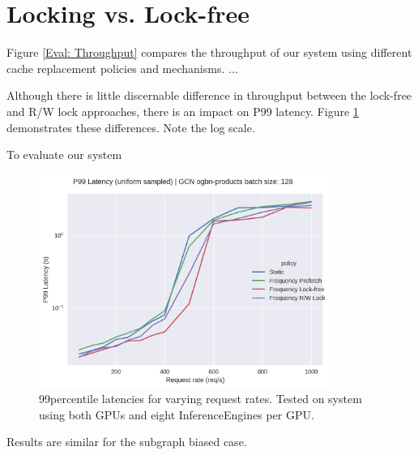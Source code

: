 \section{Locking vs. Lock-free}

Figure \ref{Eval: Throughput} compares the throughput of our system using different cache replacement policies and mechanisms.
...

Although there is little discernable difference in throughput between the lock-free and R/W lock approaches, there is an impact on P99 latency. Figure \ref{Eval: P99 latency} demonstrates these differences.
Note the log scale.

    

To evaluate our system
\begin{figure}[h!]
    \centering
    \includegraphics[width=0.85\textwidth]{figures/P99_latency_GCN_uniform_pinnedc0.2_gpus_3.png}    
    \caption{99\th percentile latencies for varying request rates. Tested on system using both GPUs and eight InferenceEngines per GPU.}
    \label{Eval: P99 latency}
\end{figure}  
Results are similar for the subgraph biased case.

